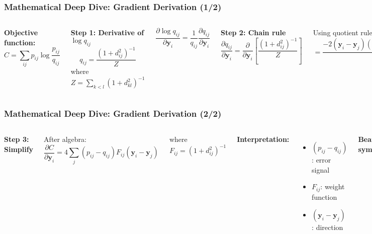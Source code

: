 \documentclass[aspectratio=169]{beamer}
\begin{document}
\begin{frame}
\frametitle{Mathematical Deep Dive: Gradient Derivation (1/2)}
\begin{columns}[T]
\textbf{Objective function:}
$$C = \sum_{ij} p_{ij} \log\frac{p_{ij}}{q_{ij}}$$

\textbf{Step 1: Derivative of $\log q_{ij}$}
$$q_{ij} = \frac{(1+d_{ij}^2)^{-1}}{Z}$$
where $Z = \sum_{k<l}(1+d_{kl}^2)^{-1}$

$$\frac{\partial \log q_{ij}}{\partial \mathbf{y}_i} = \frac{1}{q_{ij}}\frac{\partial q_{ij}}{\partial \mathbf{y}_i}$$

\textbf{Step 2: Chain rule}
\small
$$\frac{\partial q_{ij}}{\partial \mathbf{y}_i} = \frac{\partial}{\partial \mathbf{y}_i}\left[\frac{(1+d_{ij}^2)^{-1}}{Z}\right]$$

Using quotient rule:
$$= \frac{-2(\mathbf{y}_i-\mathbf{y}_j)(1+d_{ij}^2)^{-2}Z + (1+d_{ij}^2)^{-1}\frac{\partial Z}{\partial \mathbf{y}_i}}{Z^2}$$
\end{columns}
\end{frame}

\begin{frame}
\frametitle{Mathematical Deep Dive: Gradient Derivation (2/2)}
\begin{columns}[T]
\textbf{Step 3: Simplify}

After algebra:
$$\frac{\partial C}{\partial \mathbf{y}_i} = 4\sum_j (p_{ij} - q_{ij})F_{ij}(\mathbf{y}_i - \mathbf{y}_j)$$

where $F_{ij} = (1 + d_{ij}^2)^{-1}$

\vspace{0.3cm}
\textbf{Interpretation:}
\begin{itemize}
\small
\item $(p_{ij} - q_{ij})$: error signal
\item $F_{ij}$: weight function  
\item $(\mathbf{y}_i - \mathbf{y}_j)$: direction
\end{itemize}

\textbf{Beautiful symmetry:}

Force on point $i$ from $j$:
$$\mathbf{F}_{ij} = 4(p_{ij} - q_{ij})\frac{\mathbf{y}_i - \mathbf{y}_j}{1 + \|\mathbf{y}_i - \mathbf{y}_j\|^2}$$

\vspace{0.3cm}

\textbf{Note:} Student-t kernel appears\\
naturally in gradient!
\end{columns}
\end{frame}
\end{document}
